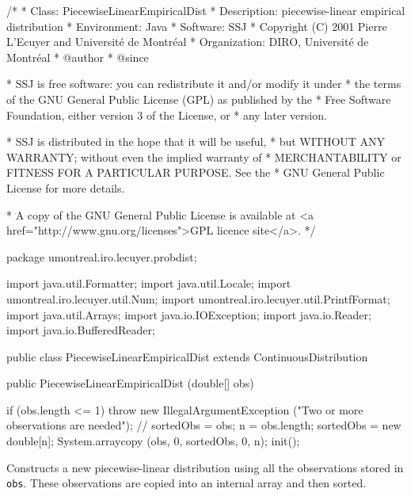\begin{code}
\begin{hide}
/*
 * Class:        PiecewiseLinearEmpiricalDist
 * Description:  piecewise-linear empirical distribution
 * Environment:  Java
 * Software:     SSJ 
 * Copyright (C) 2001  Pierre L'Ecuyer and Université de Montréal
 * Organization: DIRO, Université de Montréal
 * @author       
 * @since

 * SSJ is free software: you can redistribute it and/or modify it under
 * the terms of the GNU General Public License (GPL) as published by the
 * Free Software Foundation, either version 3 of the License, or
 * any later version.

 * SSJ is distributed in the hope that it will be useful,
 * but WITHOUT ANY WARRANTY; without even the implied warranty of
 * MERCHANTABILITY or FITNESS FOR A PARTICULAR PURPOSE.  See the
 * GNU General Public License for more details.

 * A copy of the GNU General Public License is available at
   <a href="http://www.gnu.org/licenses">GPL licence site</a>.
 */
\end{hide}
package umontreal.iro.lecuyer.probdist;\begin{hide}

import java.util.Formatter;
import java.util.Locale;
import umontreal.iro.lecuyer.util.Num;
import umontreal.iro.lecuyer.util.PrintfFormat;
import java.util.Arrays;
import java.io.IOException;
import java.io.Reader;
import java.io.BufferedReader;
\end{hide}

public class PiecewiseLinearEmpiricalDist extends ContinuousDistribution\begin{hide} {
   private double[] sortedObs;
   private double[] diffObs;
   private int n = 0;
   private double sampleMean;
   private double sampleVariance;
   private double sampleStandardDeviation;
\end{hide}

   public PiecewiseLinearEmpiricalDist (double[] obs)\begin{hide} {
      if (obs.length <= 1)
         throw new IllegalArgumentException ("Two or more observations are needed");
      // sortedObs = obs;
      n = obs.length;
      sortedObs = new double[n];
      System.arraycopy (obs, 0, sortedObs, 0, n);
      init();
   }\end{hide}
\end{code}
\begin{tabb} 
  Constructs a new piecewise-linear distribution using
  all the observations stored in \texttt{obs}.
  These observations are copied into an internal array and then sorted.
\end{tabb}
